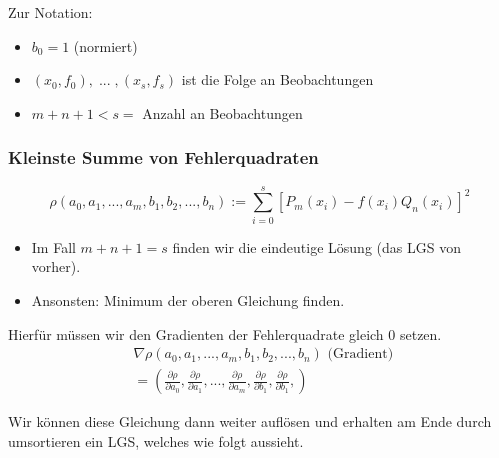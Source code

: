 \documentclass[a4paper]{article}
\begin{document}
Zur Notation:
\begin{itemize}
	\item $b_0 = 1$ (normiert)
	\item $(x_0, f_0), \; ... \;, (x_s, f_s)$
		ist die Folge an Beobachtungen
	\item $m + n + 1 < s =$ Anzahl an Beobachtungen
\end{itemize}

\subsubsection{Kleinste Summe von Fehlerquadraten}

\[
\rho \left(
	a_0, a_1, ..., a_m,
	b_1, b_2, ..., b_n
\right) :=
\sum_{i=0}^{s} \left[
	P_m (x_i) - f(x_i) Q_n (x_i)
\right] ^2
\] 

\begin{itemize}
	\item Im Fall $m+n+1 = s$ finden wir die eindeutige Lösung 
		(das LGS von vorher).
	\item Ansonsten: Minimum der oberen Gleichung finden.
\end{itemize}

Hierfür müssen wir den Gradienten der Fehlerquadrate gleich $0$ setzen.
\begin{align*}
	& \nabla
		\rho \left(
			a_0, a_1, ..., a_m,
			b_1, b_2, ..., b_n
		\right) 
		\text{ (Gradient) }
		\\
	&= \left(
		\frac{ \partial \rho }{ \partial a_0 },
		\frac{ \partial \rho }{ \partial a_1 },
		...,
		\frac{ \partial \rho }{ \partial a_m },
		\frac{ \partial \rho }{ \partial b_1 },
		\frac{ \partial \rho }{ \partial b_1 },
	\right) 
\end{align*}

Wir können diese Gleichung dann weiter auflösen und erhalten am Ende durch
umsortieren ein LGS, welches wie folgt aussieht.
\end{document}
